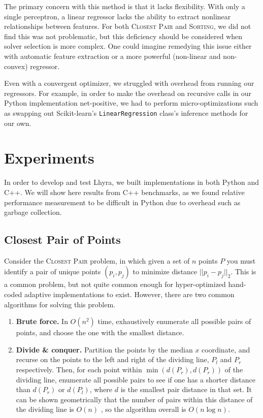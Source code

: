 \documentclass[11pt]{article}
\begin{document}
The primary concern with this method is that it lacks flexibility. With only a single perceptron, a linear regressor lacks the ability to extract nonlinear relationships between features. For both \textsc{Closest Pair} and \textsc{Sorting}, we did not find this was not problematic, but this deficiency should be considered when solver selection is more complex. One could imagine remedying this issue either with automatic feature extraction or a more powerful (non-linear and non-convex) regressor.

Even with a convergent optimizer, we struggled with overhead from running our regressors.  For example, in order to make the overhead on recursive calls in our Python implementation net-positive, we had to perform micro-optimizations such as swapping out Scikit-learn's \texttt{LinearRegression} \cite{sklearn} class's inference methods for our own. 

\section{Experiments}

In order to develop and test Lhyra, we built implementations in both Python and C++.  We will  show here results from C++ benchmarks, as we found relative performance measurement to be difficult in Python due to overhead such as garbage collection.

\subsection{Closest Pair of Points}

Consider the \textsc{Closest Pair} problem, in which given a set of $n$ points $P$ you must identify a pair of unique points $(p_i,p_j)$ to minimize distance $||p_i - p_j||_2$.  This is a common problem, but not quite common enough for hyper-optimized hand-coded adaptive implementations to exist.  However, there are two common algorithms for solving this problem.

\begin{enumerate}
    \item \textbf{Brute force.}  In $O(n^2)$ time, exhaustively enumerate all possible pairs of points, and choose the one with the smallest distance.
    \item \textbf{Divide \& conquer.}  Partition the points by the median $x$ coordinate, and recurse on the points to the left and right of the dividing line, $P_l$ and $P_r$ respectively.  Then, for each point within $\min(d(P_r),d(P_r))$ of the dividing line, enumerate all possible pairs to see if one has a shorter distance than $d(P_r)$ or $d(P_l)$, where $d$ is the smallest pair distance in that set.  It can be shown geometrically that the number of pairs within this distance of the dividing line is $O(n)$ \cite{clrs}, so the algorithm overall is $O(n\log n)$.
\end{enumerate}
\end{document}

